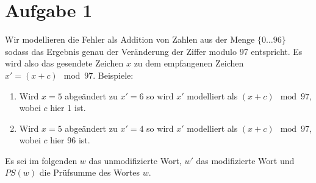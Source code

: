 

\section*{Aufgabe 1}
Wir modellieren die Fehler als Addition von Zahlen aus der Menge $\lbrace 0 \ldots 96\rbrace$ sodass das Ergebnis genau der Veränderung der Ziffer modulo 97 entspricht.
Es wird also das gesendete Zeichen $x$ zu dem empfangenen Zeichen $x' = (x + c) \mod 97$.
Beispiele:
\begin{enumerate}
	\item Wird $x = 5$ abgeändert zu $x' = 6$ so wird $x'$  modelliert als $(x + c) \mod 97$, wobei $c$ hier 1 ist.
	\item Wird $x = 5$ abgeändert zu $x' = 4$ so wird $x'$  modelliert als $(x + c) \mod 97$, wobei $c$ hier 96 ist.
\end{enumerate}

Es sei im folgenden $w$ das unmodifizierte Wort, $w'$ das modifizierte Wort und $PS(w)$ die Prüfsumme des Wortes $w$.

